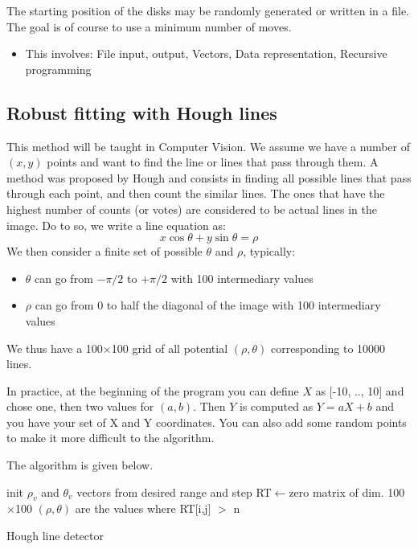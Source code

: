 \documentclass{ecnreport}
\begin{document}
The starting position of the disks may be randomly generated or written in a file. The goal is of course to use a minimum number of moves.

\begin{itemize}
 \item This involves: File input, output, Vectors, Data representation, Recursive programming
 \end{itemize}
 
 \subsection{Robust fitting with Hough lines}
 
 This method will be taught in Computer Vision. We assume we have a number of $(x,y)$ points and want to find the line or lines that pass through them.
 A method was proposed by Hough and consists in finding all possible lines that pass through each point, and then count the similar lines. The ones that have
 the highest number of counts (or votes) are considered to be actual lines in the image.
 Do to so, we write a line equation as:
 \begin{equation*}
  x\cos\theta + y\sin\theta = \rho
 \end{equation*}We then consider a finite set of possible $\theta$ and $\rho$, typically:
 \begin{itemize}
  \item $\theta$ can go from $-\pi/2$ to $+\pi/2$ with 100 intermediary values
  \item $\rho$ can go from 0 to half the diagonal of the image with 100 intermediary values
 \end{itemize}
 We thus have a 100$\times$100 grid of all potential $(\rho,\theta)$ corresponding to 10000 lines.
 
 In practice, at the beginning of the program you can define $X$ as [-10, .., 10] and chose one, then two values for $(a,b)$.
 Then $Y$ is computed as $Y=aX+b$ and you have your set of X and Y coordinates. You can also add some random points to make it more difficult to the algorithm.
 
 The algorithm is given below.

 
\begin{algorithm}[!h]
{}
init $\rho_v$ and $\theta_v$ vectors from desired range and step\;
RT$\gets$zero matrix of dim. 100$\times$100\;
$(\rho,\theta)$ are the values where RT[i,j] $>$ n\;
\caption{Hough line detector}
\label{algo:hough}
\end{algorithm}
\end{document}
